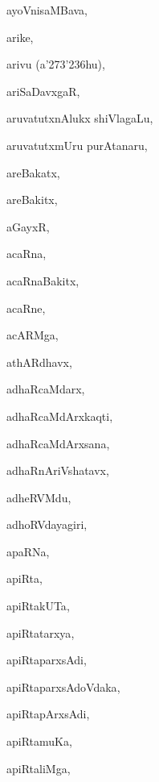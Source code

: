 \begin{multicols}{3}
{\noindent
{ayoVnisaMBava}, \pageref{ayoVnisaMBava}

\noindent
{arike}, \pageref{arike}

\noindent
{arivu (a\char'273\char'236hu)}, \pageref{arivu (a273236hu)}

\noindent
{ariSaDavxgaR}, \pageref{ariSaDavxgaR}

\noindent
{aruvatutxnAlukx shiVlagaLu}, \pageref{aruvatutxnAlukx shiVlagaLu}

\noindent
{aruvatutxmUru purAtanaru}, \pageref{aruvatutxmUru purAtanaru}

\noindent
{areBakatx}, \pageref{areBakatx}

\noindent
{areBakitx}, \pageref{areBakitx}

\noindent
{aGayxR}, \pageref{aGayxR}

\noindent
{acaRna}, \pageref{acaRna}

\noindent
{acaRnaBakitx}, \pageref{acaRnaBakitx}

\noindent
{acaRne}, \pageref{acaRne}

\noindent
{acARMga}, \pageref{acARMga}

\noindent
{athARdhavx}, \pageref{athARdhavx}

\noindent
{adhaRcaMdarx}, \pageref{adhaRcaMdarx}

\noindent
{adhaRcaMdArxkaqti}, \pageref{adhaRcaMdArxkaqti}

\noindent
{adhaRcaMdArxsana}, \pageref{adhaRcaMdArxsana}

\noindent
{adhaRnAriVshatavx}, \pageref{adhaRnAriVshatavx}

\noindent
{adheRVMdu}, \pageref{adheRVMdu}

\noindent
{adhoRVdayagiri}, \pageref{adhoRVdayagiri}

\noindent
{apaRNa}, \pageref{apaRNa}

\noindent
{apiRta}, \pageref{apiRta}

\noindent
{apiRtakUTa}, \pageref{apiRtakUTa}

\noindent
{apiRtatarxya}, \pageref{apiRtatarxya}

\noindent
{apiRtaparxsAdi}, \pageref{apiRtaparxsAdi}

\noindent
{apiRtaparxsAdoVdaka}, \pageref{apiRtaparxsAdoVdaka}

\noindent
{apiRtapArxsAdi}, \pageref{apiRtapArxsAdi}

\noindent
{apiRtamuKa}, \pageref{apiRtamuKa}

\noindent
{apiRtaliMga}, \pageref{apiRtaliMga}

}
\end{multicols}
